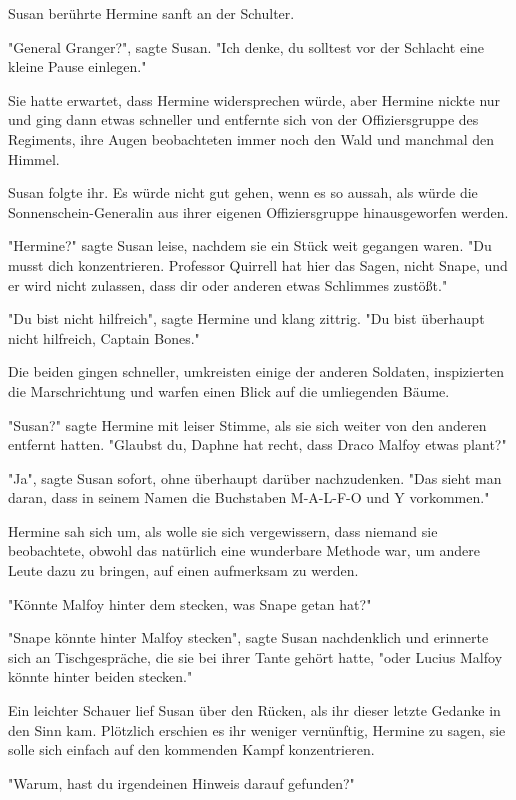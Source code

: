 {Susan berührte Hermine sanft an der Schulter.

"General Granger?", sagte Susan. "Ich denke, du solltest vor der Schlacht eine kleine Pause einlegen."

Sie hatte erwartet, dass Hermine widersprechen würde, aber Hermine nickte nur und ging dann etwas schneller und entfernte sich von der Offiziersgruppe des Regiments, ihre Augen beobachteten immer noch den Wald und manchmal den Himmel.

Susan folgte ihr. Es würde nicht gut gehen, wenn es so aussah, als würde die Sonnenschein-Generalin aus ihrer eigenen Offiziersgruppe hinausgeworfen werden.

"Hermine?" sagte Susan leise, nachdem sie ein Stück weit gegangen waren. "Du musst dich konzentrieren. Professor Quirrell hat hier das Sagen, nicht Snape, und er wird nicht zulassen, dass dir oder anderen etwas Schlimmes zustößt."

"Du bist nicht hilfreich", sagte Hermine und klang zittrig. "Du bist überhaupt nicht hilfreich, Captain Bones."

Die beiden gingen schneller, umkreisten einige der anderen Soldaten, inspizierten die Marschrichtung und warfen einen Blick auf die umliegenden Bäume.

"Susan?" sagte Hermine mit leiser Stimme, als sie sich weiter von den anderen entfernt hatten. "Glaubst du, Daphne hat recht, dass Draco Malfoy etwas plant?"

"Ja", sagte Susan sofort, ohne überhaupt darüber nachzudenken. "Das sieht man daran, dass in seinem Namen die Buchstaben M-A-L-F-O und Y vorkommen."

Hermine sah sich um, als wolle sie sich vergewissern, dass niemand sie beobachtete, obwohl das natürlich eine wunderbare Methode war, um andere Leute dazu zu bringen, auf einen aufmerksam zu werden.

"Könnte Malfoy hinter dem stecken, was Snape getan hat?"

"Snape könnte hinter Malfoy stecken", sagte Susan nachdenklich und erinnerte sich an Tischgespräche, die sie bei ihrer Tante gehört hatte, "oder Lucius Malfoy könnte hinter beiden stecken."

Ein leichter Schauer lief Susan über den Rücken, als ihr dieser letzte Gedanke in den Sinn kam. Plötzlich erschien es ihr weniger vernünftig, Hermine zu sagen, sie solle sich einfach auf den kommenden Kampf konzentrieren.

"Warum, hast du irgendeinen Hinweis darauf gefunden?"

}

